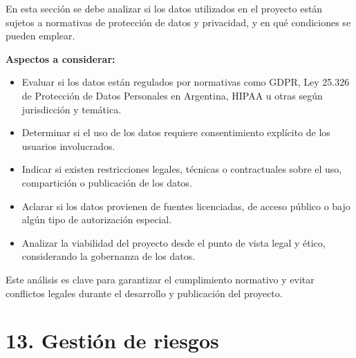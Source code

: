 \documentclass[
11pt, %
]{charter}
\begin{document}
En esta sección se debe analizar si los datos utilizados en el proyecto están sujetos a normativas de protección de datos y privacidad, y en qué condiciones se pueden emplear.

\textbf{Aspectos a considerar:}
\begin{itemize}
  \item Evaluar si los datos están regulados por normativas como GDPR, Ley 25.326 de Protección de Datos Personales en Argentina, HIPAA u otras según jurisdicción y temática.
  \item Determinar si el uso de los datos requiere consentimiento explícito de los usuarios involucrados.
  \item Indicar si existen restricciones legales, técnicas o contractuales sobre el uso, compartición o publicación de los datos.
  \item Aclarar si los datos provienen de fuentes licenciadas, de acceso público o bajo algún tipo de autorización especial.
  \item Analizar la viabilidad del proyecto desde el punto de vista legal y ético, considerando la gobernanza de los datos.
\end{itemize}

Este análisis es clave para garantizar el cumplimiento normativo y evitar conflictos legales durante el desarrollo y publicación del proyecto.


\section{13. Gestión de riesgos}
\label{sec:riesgos}
\end{document}
